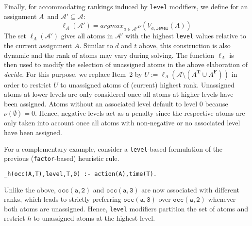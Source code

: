 \documentclass[letterpaper]{article}
\newcommand{\true}{\ensuremath{\boldsymbol{T}}}
\newcommand{\false}{\ensuremath{\boldsymbol{F}}}
\newcommand{\ass}{\ensuremath{A}}
\newcommand{\tlits}[1]{\ensuremath{{#1}^{\true}}}
\newcommand{\flits}[1]{\ensuremath{{#1}^{\false}}}
\begin{document}
Finally, for accommodating rankings induced by \texttt{level} modifiers,
we define for an assignment \ass\ and $\mathcal{A}'\subseteq\mathcal{A}$:
\[
\ell_\ass(\mathcal{A}')=\textit{argmax}_{a\in\mathcal{A}'}\nu(V_{a,\mathtt{level}}(\ass))
\]
The set $\ell_\ass(\mathcal{A}')$ gives all atoms in $\mathcal{A}'$ with the highest \texttt{level} values relative to
the current assignment \ass.
Similar to $d$ and $t$ above, this construction is also dynamic and the rank of atoms may vary during solving.
The function $\ell_\ass$ is then used to modify the selection of unassigned atoms in the above elaboration of \textit{decide}.
For this purpose, we replace Item~2 by
\(
U:=\ell_\ass(\mathcal{A}\setminus (\tlits{\ass}\cup\flits{\ass}))
\)
in order to restrict $U$ to unassigned atoms of (current) highest rank.
Unassigned atoms at lower levels are only considered once all atoms at higher levels have been assigned.
Atoms without an associated level default to level 0 because $\nu(\emptyset)=0$.
Hence, negative levels act as a penalty since the respective atoms are only taken into account
once all atoms with non-negative or no associated level have been assigned.

For a complementary example, 
consider a \texttt{level}-based formulation of the previous (\texttt{factor}-based) heuristic rule.
\begin{lstlisting}
_h(occ(A,T),level,T,0) :- action(A),time(T).
\end{lstlisting}
Unlike the above, $\mathtt{occ(a,2)}$ and $\mathtt{occ(a,3)}$ are now associated with different ranks,
which leads to strictly preferring $\mathtt{occ(a,3)}$ over $\mathtt{occ(a,2)}$ 
whenever both atoms are unassigned.
Hence, \texttt{level} modifiers partition the set of atoms and restrict $h$ to unassigned atoms at the highest level.
\end{document}

